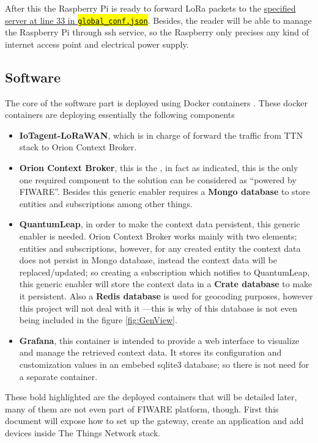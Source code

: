 \documentclass[11pt,a4paper,dvipsnames,twoside]{article}
\newcommand{\myuline}[1]{%
  \uline{\phantom{#1}}%
  \llap{\contour{white}{#1}}%
}
\newcommand{\cmd}[1] {\hl{\texttt{#1}}}
\begin{document}
After this the Raspberry Pi is ready to forward LoRa packets to the \href{https://github.com/dragino/dual_chan_pkt_fwd/blob/master/global_conf.json#L33}{specified server at line 33 in \cmd{global\_conf.json}}. Besides, the reader will be able to manage the Raspberry Pi through ssh service, so the Raspberry only precises any kind of internet access point and electrical power supply.

\subsection{Software}

The core of the software part is deployed using Docker containers \cite{Docker_container}. These docker containers are deploying essentially the following components

\begin{itemize}
  \item \textbf{IoTagent-LoRaWAN}, which is in charge of forward the traffic from TTN stack to Orion Context Broker.
  \item \textbf{Orion Context Broker}, this is the \myuline{core generic enabler}, in fact as indicated, this is the only one required component to the solution can be considered as \enquote{powered by FIWARE}. Besides this generic enabler requires a \textbf{Mongo database} to store entities and subscriptions among other things. 
  \item \textbf{QuantumLeap}, in order to make the context data persistent, this generic enabler is needed. Orion Context Broker works mainly with two elements; entities and subscriptions, however, for any created entity the context data does not persist in Mongo database, instead the context data will be replaced/updated; so creating a subscription which notifies to QuantumLeap, this generic enabler will store the context data in a \textbf{Crate database} to make it persistent. Also a \textbf{Redis database} is used for geocoding purposes, however this project will not deal with it ---this is why of this database is not even being included in the figure \ref{fig:GenView}.
  \item \textbf{Grafana}, this container is intended to provide a web interface to visualize and manage the retrieved context data. It stores its configuration and customization values in an embebed sqlite3 database; so there is not need for a separate container. 
\end{itemize}

These bold highlighted are the deployed containers that will be detailed later, many of them are not even part of FIWARE platform, though. First this document will expose how to set up the gateway, create an application and add devices inside The Things Network stack. 
\end{document}

